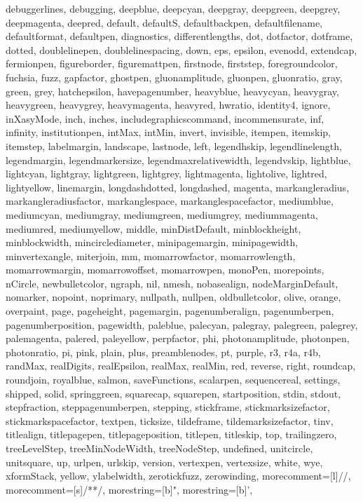 {{  debuggerlines, debugging, deepblue, deepcyan, deepgray, deepgreen, deepgrey,
  deepmagenta, deepred, default, defaultS, defaultbackpen, defaultfilename,
  defaultformat, defaultpen, diagnostics, differentlengths, dot, dotfactor,
  dotframe, dotted, doublelinepen, doublelinespacing, down, eps, epsilon,
  evenodd, extendcap, fermionpen, figureborder, figuremattpen, firstnode,
  firststep, foregroundcolor, fuchsia, fuzz, gapfactor, ghostpen,
  gluonamplitude, gluonpen, gluonratio, gray, green, grey, hatchepsilon,
  havepagenumber, heavyblue, heavycyan, heavygray, heavygreen, heavygrey,
  heavymagenta, heavyred, hwratio, identity4, ignore, inXasyMode, inch, inches,
  includegraphicscommand, incommensurate, inf, infinity, institutionpen,
  intMax, intMin, invert, invisible, itempen, itemskip, itemstep, labelmargin,
  landscape, lastnode, left, legendhskip, legendlinelength, legendmargin,
  legendmarkersize, legendmaxrelativewidth, legendvskip, lightblue, lightcyan,
  lightgray, lightgreen, lightgrey, lightmagenta, lightolive, lightred,
  lightyellow, linemargin, longdashdotted, longdashed, magenta,
  markangleradius, markangleradiusfactor, markanglespace, markanglespacefactor,
  mediumblue, mediumcyan, mediumgray, mediumgreen, mediumgrey, mediummagenta,
  mediumred, mediumyellow, middle, minDistDefault, minblockheight,
  minblockwidth, mincirclediameter, minipagemargin, minipagewidth,
  minvertexangle, miterjoin, mm, momarrowfactor, momarrowlength,
  momarrowmargin, momarrowoffset, momarrowpen, monoPen, morepoints, nCircle,
  newbulletcolor, ngraph, nil, nmesh, nobasealign, nodeMarginDefault, nomarker,
  nopoint, noprimary, nullpath, nullpen, oldbulletcolor, olive, orange,
  overpaint, page, pageheight, pagemargin, pagenumberalign, pagenumberpen,
  pagenumberposition, pagewidth, paleblue, palecyan, palegray, palegreen,
  palegrey, palemagenta, palered, paleyellow, perpfactor, phi, photonamplitude,
  photonpen, photonratio, pi, pink, plain, plus, preamblenodes, pt, purple, r3,
  r4a, r4b, randMax, realDigits, realEpsilon, realMax, realMin, red, reverse,
  right, roundcap, roundjoin, royalblue, salmon, saveFunctions, scalarpen,
  sequencereal, settings, shipped, solid, springgreen, squarecap, squarepen,
  startposition, stdin, stdout, stepfraction, steppagenumberpen, stepping,
  stickframe, stickmarksizefactor, stickmarkspacefactor, textpen, ticksize,
  tildeframe, tildemarksizefactor, tinv, titlealign, titlepagepen,
  titlepageposition, titlepen, titleskip, top, trailingzero, treeLevelStep,
  treeMinNodeWidth, treeNodeStep, undefined, unitcircle, unitsquare, up,
  urlpen, urlskip, version, vertexpen, vertexsize, white, wye, xformStack,
  yellow, ylabelwidth, zerotickfuzz, zerowinding},
  morecomment=[l]{//},%
  morecomment=[s]{/*}{*/},%
  morestring=[b]",%
  morestring=[b]',%
}
